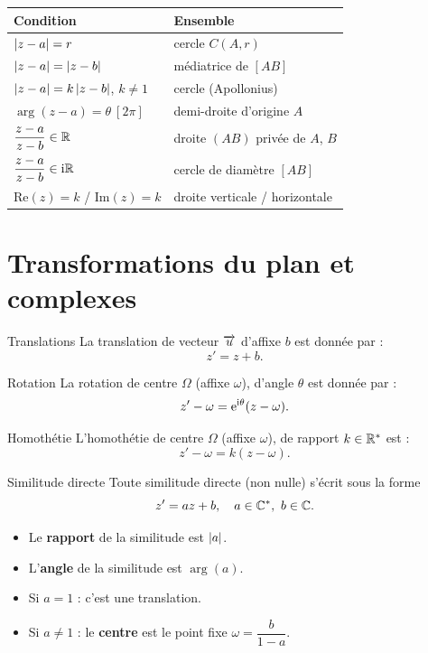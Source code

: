 \begin{center}
\renewcommand{\arraystretch}{1.35}
\begin{tabular}{>{\raggedright\arraybackslash}p{4.0cm}
                >{\raggedright\arraybackslash}p{4.2cm}}
\hline
\textbf{Condition} & \textbf{Ensemble} \\
\hline
$\left|z - a\right| = r$ & cercle $C(A, r)$ \\
$\left|z - a\right| = \left|z - b\right|$ & médiatrice de $[AB]$ \\
$\left|z - a\right| = k\left|z - b\right|$, $k \neq 1$ & cercle (Apollonius) \\
$\arg(z - a) = \theta\ [2\pi]$ & demi-droite d'origine $A$ \\
$\dfrac{z - a}{z - b} \in \mathbb{R}$ & droite $(AB)$ privée de $A$, $B$ \\
$\dfrac{z - a}{z - b} \in \mathrm{i}\mathbb{R}$ & cercle de diamètre $[AB]$ \\
$\mathrm{Re}(z) = k$ / $\mathrm{Im}(z) = k$ & droite verticale / horizontale \\
\hline
\end{tabular}
\end{center}


\section{Transformations du plan et complexes}

\begin{propriete}{Translations}{}
	La translation de vecteur $\overrightarrow{u}$ d'affixe $b$ est donnée par :
	$$
	z' = z + b.
	$$
\end{propriete}

\begin{propriete}{Rotation}{}
	La rotation de centre $\Omega$ (affixe $\omega$), d'angle $\theta$ est donnée par :
	$$
	z' - \omega = \mathrm{e}^{\mathrm{i}\theta}(z - \omega).
	$$
\end{propriete}

\begin{propriete}{Homothétie}{}
	L'homothétie de centre $\Omega$ (affixe $\omega$), de rapport $k \in \mathbb{R}^*$ est :
	$$
	z' - \omega = k(z - \omega).
	$$
\end{propriete}

\begin{propriete}{Similitude directe}{}
	Toute similitude directe (non nulle) s'écrit sous la forme
	$$
	z' = az + b, \quad a \in \mathbb{C}^*,\ b \in \mathbb{C}.
	$$
	\begin{itemize}[label=\textbullet]
		\item Le \textbf{rapport} de la similitude est $\left|a\right|$.
		\item L'\textbf{angle} de la similitude est $\arg(a)$.
		\item Si $a = 1$ : c'est une translation.
		\item Si $a \neq 1$ : le \textbf{centre} est le point fixe $\omega = \dfrac{b}{1 - a}$.
	\end{itemize}
\end{propriete}

